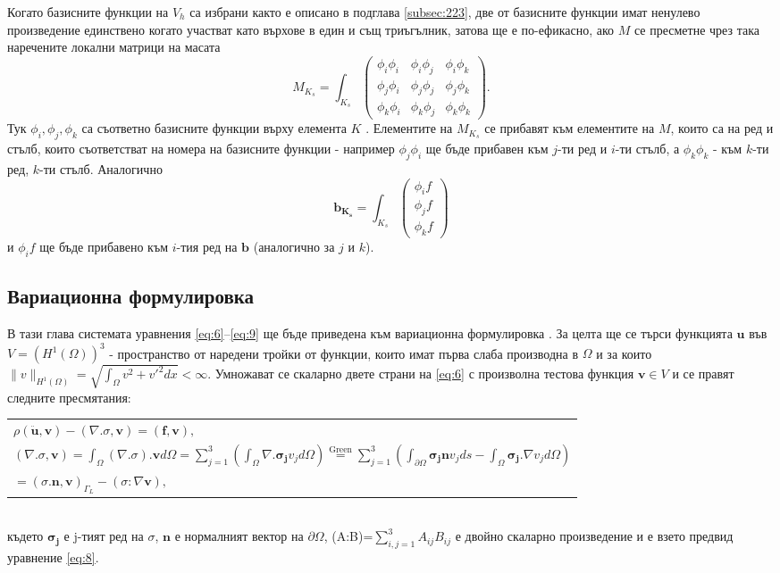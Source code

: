 \documentclass{report}
\begin{document}
	Когато базисните функции на $V_h$ са избрани както е описано в подглава \ref{subsec:223}, две от базисните функции имат ненулево произведение единствено когато участват като върхове в един и същ триъгълник, затова ще е по-ефикасно, ако $M$ се пресметне чрез така наречените локални матрици на масата
	\[
	M_{K_s}=\int_{K_s}
	\begin{pmatrix}
		\phi_i\phi_i & \phi_i\phi_j & \phi_i\phi_k \\
		\phi_j\phi_i & \phi_j\phi_j & \phi_j\phi_k \\
		\phi_k\phi_i & \phi_k\phi_j & \phi_k\phi_k
	\end{pmatrix}.
	\]
	Тук $\phi_i,\phi_j,\phi_k$ са съответно базисните функции върху елемента $K$ \cite{larson2013finite}. Елементите на $M_{K_s}$ се прибавят към елементите на $M$, които са на ред и стълб, които съответстват на номера на базисните функции - например $\phi_j\phi_i$ ще бъде прибавен към $j$-ти ред и $i$-ти стълб, а $\phi_k\phi_k$ - към $k$-ти ред, $k$-ти стълб. Аналогично 
	\[
	\boldsymbol{b_{K_s}}=\int_{K_s}
	\begin{pmatrix}
		\phi_i f\\
		\phi_j f\\
		\phi_k f
	\end{pmatrix}
	\]
	и $\phi_i f$ ще бъде прибавено към $i$-тия ред на $\mathbf{b}$ (аналогично за $j$ и $k$).
	\subsection{Вариационна формулировка}
	
	В тази глава системата уравнения \eqref{eq:6}--\eqref{eq:9} ще бъде приведена към вариационна формулировка \cite{larson2013finite}. За целта ще се търси функцията $\mathbf{u}$ във $V=(H^1(\Omega ))^3$ - пространство от наредени тройки от функции, които имат първа слаба производна в $\Omega$ и за които $\lVert v \rVert_{H^1(\Omega)} =\sqrt{\int_\Omega v^2 + v'^2 dx} < \infty $. Умножават се скаларно двете страни на \eqref{eq:6} с произволна тестова функция $\mathbf{v} \in V$ и се правят следните пресмятания:
	\\
	\begin{tabular}{l}
		$\rho (\ddot{\mathbf{u}},\mathbf{v})-(\nabla . \sigma, \mathbf{v})=(\mathbf{f},\mathbf{v}),$ \\
		$(\nabla . \sigma, \mathbf{v}) =\displaystyle \int_\Omega (\nabla . \sigma). \mathbf{v} d\Omega= \sum_{j=1}^3\left( \int_\Omega \nabla . \boldsymbol{\sigma_j} v_j d\Omega\right) \overset{\text{Green}}{=} \sum_{j=1}^3( \int_{\partial \Omega} \boldsymbol{\sigma_j} \mathbf{n}v_jds - \int_\Omega \boldsymbol{\sigma_j}. \nabla v_j d\Omega)$ \\
		$=  (\sigma . \mathbf{n, \mathbf{v}})_{\Gamma_L} - (\sigma : \nabla \mathbf{v}),$
	\end{tabular}
	\\
	където $\boldsymbol{\sigma_j}$ е j-тият ред на $\sigma$, $\mathbf{n}$ е нормалният вектор на $\partial \Omega$, (A:B)=$\sum_{i,j=1}^3A_{ij}B_{ij}$ е двойно скаларно произведение и е взето предвид уравнение \eqref{eq:8}. 
	
\end{document}
